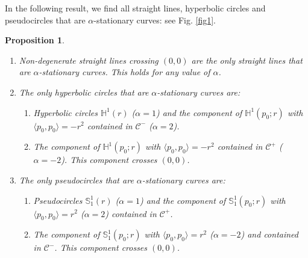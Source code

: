 \documentclass[a4paper,12pt]{amsart}
\newtheorem{proposition}[theorem]{Proposition}
\theoremstyle{definition}
\def\h{\mathbb H}
\def\s{\mathbb S}
\begin{document}
In the following result, we find all straight lines, hyperbolic circles and pseudocircles that are $\alpha$-stationary curves:  see   Fig. \ref{fig1}. 

\begin{proposition}\label{pr1}
\begin{enumerate}
\item Non-degenerate straight lines crossing $(0,0)$ are the  only straight lines that are $\alpha$-stationary curves. This holds for any value of $\alpha$.
\item The only hyperbolic circles that are $\alpha$-stationary curves are:
\  \begin{enumerate}
\item  Hyperbolic circles $\h^1(r)$ ($\alpha=1$) and the component of  $\h^1(p_0;r)$ with $\langle p_0,p_0\rangle=-r^2$ contained in $\mathcal{C}^-$ ($\alpha=2$). 
\item The component of  $\h^1(p_0;r)$ with $\langle p_0,p_0\rangle=-r^2$ contained in $\mathcal{C}^+$ ($\alpha=-2$). This component crosses $(0,0)$.  
\end{enumerate}
\item The only pseudocircles that are $\alpha$-stationary curves are:
\begin{enumerate}
\item  Pseudocircles $\s^1_{1}(r)$ ($\alpha=1$) and  the component of    $\s^1_{1}(p_0;r)$ with $\langle p_0,p_0\rangle=r^2$  ($\alpha=2$) contained in $\mathcal{C}^+$.  
\item The component of  $\s^1_{1}(p_0;r)$   with $\langle p_0,p_0\rangle=r^2$  ($\alpha=-2$) and contained in $ \mathcal{C}^-$. This component  crosses $(0,0)$.  
\end{enumerate} 
 \end{enumerate}
\end{proposition}
\end{document}
